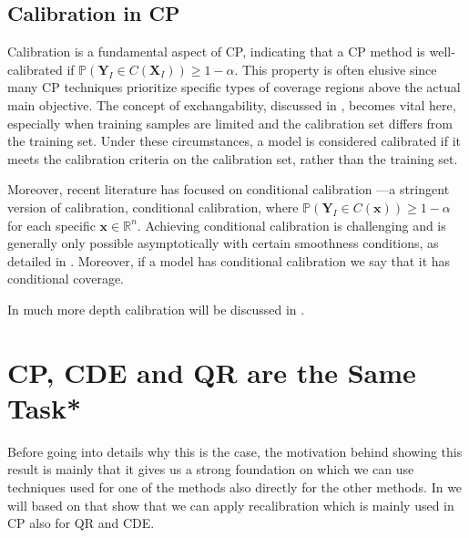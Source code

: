 \subsection{Calibration in CP}\label{sec:calibration_cp}

Calibration is a fundamental aspect of CP, indicating that a CP method is well-calibrated if $\mathbb{P}(\mathbf{Y}_I \in C(\mathbf{X}_I)) \geq 1 - \alpha$. This property is often elusive since many CP techniques prioritize specific types of coverage regions above the actual main objective. The concept of exchangability, discussed in , becomes vital here, especially when training samples are limited and the calibration set differs from the training set. Under these circumstances, a model is considered calibrated if it meets the calibration criteria on the calibration set, rather than the training set.

Moreover, recent literature has focused on conditional calibration \cite{sesia2021conformal,izbicki2022cd,izbicki2019flexible,chernozhukov2021distributional}—a stringent version of calibration, conditional calibration, where $\mathbb{P}(\mathbf{Y}_I \in C(\mathbf{x})) \geq 1 - \alpha$ for each specific $\mathbf{x} \in \mathbb{R}^n$. Achieving conditional calibration is challenging and is generally only possible asymptotically with certain smoothness conditions, as detailed in . Moreover, if a model has conditional calibration we say that it has conditional coverage.

In much more depth calibration will be discussed in .

\section{CP, CDE and QR are the Same Task*}\label{sec:cp_sub_cde}

Before going into details why this is the case, the motivation behind showing this result is mainly that it gives us a strong foundation on which we can use techniques used for one of the methods also directly for the other methods. In  we will based on that show that we can apply recalibration which is mainly used in CP also for QR and CDE.

